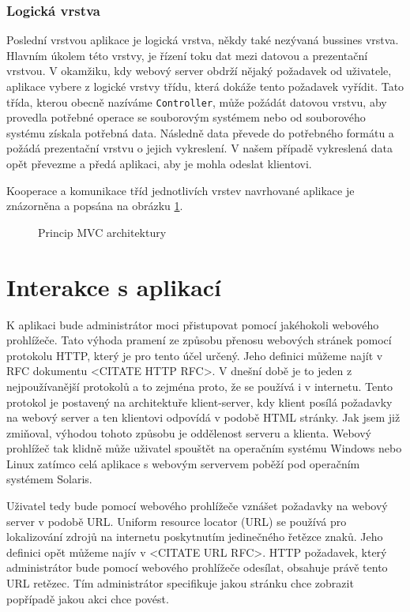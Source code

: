         \subsubsection{Logická vrstva}
        Poslední vrstvou aplikace je logická vrstva, někdy také nezývaná bussines vrstva. Hlavním úkolem této vrstvy, je řízení toku dat mezi datovou a prezentační vrstvou. V okamžiku, kdy webový server obdrží nějaký požadavek od uživatele, aplikace vybere z logické vrstvy třídu, která dokáže tento požadavek vyřídit. Tato třída, kterou obecně nazíváme \verb|Controller|, může požádát datovou vrstvu, aby provedla potřebné operace se souborovým systémem nebo od souborového systému získala potřebná data. Následně data převede do potřebného formátu a požádá prezentační vrstvu o jejich vykreslení. V našem případě vykreslená data opět převezme a předá aplikaci, aby je mohla odeslat klientovi.

        Kooperace a komunikace tříd jednotlivích vrstev navrhované aplikace je znázorněna a popsána na obrázku \ref{mvc}.

    \begin{figure}[h]
        \caption{Princip MVC architektury}
        \label{mvc}
    \end{figure}
\section{Interakce s aplikací}
K aplikaci bude administrátor moci přistupovat pomocí jakéhokoli webového prohlížeče. Tato výhoda pramení ze způsobu přenosu webových stránek pomocí protokolu HTTP, který je pro tento účel určený. Jeho definici můžeme najít v RFC dokumentu <CITATE HTTP RFC>. V dnešní době je to jeden z nejpoužívanější protokolů a to zejména proto, že se používá i v internetu. Tento protokol je postavený na architektuře klient-server, kdy klient posílá požadavky na webový server a ten klientovi odpovídá v podobě HTML stránky. Jak jsem již zmiňoval, výhodou tohoto způsobu je oddělenost serveru a klienta. Webový prohlížeč tak klidně může uživatel spouštět na operačním systému Windows nebo Linux zatímco celá aplikace s webovým servervem poběží pod operačním systémem Solaris.

Uživatel tedy bude pomocí webového prohlížeče vznášet požadavky na webový server v podobě URL. Uniform resource locator (URL) se používá pro lokalizování zdrojů na internetu poskytnutím jedinečného řetězce znaků. Jeho definici opět můžeme najív v <CITATE URL RFC>. HTTP požadavek, který administrátor bude pomocí webového prohlížeče odesílat, obsahuje právě tento URL retězec. Tím administrátor specifikuje jakou stránku chce zobrazit popřípadě jakou akci chce povést.

